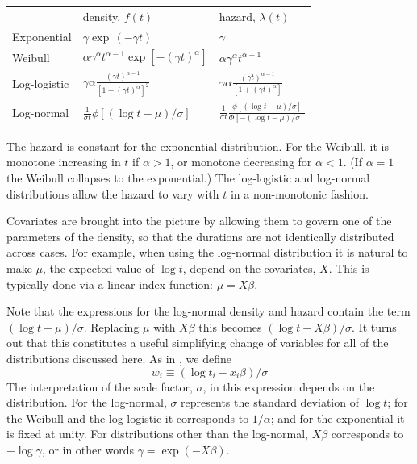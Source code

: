 \begin{center}
\setlength\tabcolsep{1.5em}
\begin{tabular}{lll}
 & density, $f(t)$ & hazard, $\lambda(t)$ \\ [1ex]
Exponential & $\displaystyle 
\gamma \exp\,(-\gamma t)$ &$\displaystyle
\gamma$ \\ [1ex]
Weibull & $\displaystyle
\alpha\gamma^{\alpha}t^{\alpha-1}\exp\left[-(\gamma t)^\alpha\right]$ 
& $\displaystyle \alpha\gamma^{\alpha}t^{\alpha-1}$ \\ [1ex]
Log-logistic & $\displaystyle \gamma\alpha
\frac{(\gamma t)^{\alpha-1}}
{\left[1 + (\gamma t)^\alpha\right]^2}$ 
& $\displaystyle \gamma\alpha
\frac{(\gamma t)^{\alpha-1}}
{\left[1 + (\gamma t)^\alpha\right]}$ \\ [2.5ex]
Log-normal & $\displaystyle
\frac{1}{\sigma t} \phi\left[(\log t - \mu)/\sigma \right]$ 
& $\displaystyle
\frac{1}{\sigma t} \frac{\phi\left[(\log t - \mu)/\sigma \right]}
{\Phi\left[-(\log t - \mu)/\sigma \right]}$
\end{tabular}
\end{center}

The hazard is constant for the exponential distribution.  For the
Weibull, it is monotone increasing in $t$ if $\alpha > 1$, or
monotone decreasing for $\alpha < 1$. (If $\alpha = 1$ the Weibull
collapses to the exponential.)  The log-logistic and log-normal
distributions allow the hazard to vary with $t$ in a non-monotonic
fashion.

Covariates are brought into the picture by allowing them to govern one
of the parameters of the density, so that the durations are not
identically distributed across cases.  For example, when using the
log-normal distribution it is natural to make $\mu$, the expected
value of $\log t$, depend on the covariates, $X$.  This is typically
done via a linear index function: $\mu = X\beta$.

Note that the expressions for the log-normal density and hazard
contain the term $(\log t - \mu)/\sigma$.  Replacing $\mu$ with
$X\beta$ this becomes $(\log t - X\beta)/\sigma$.  It turns out that
this constitutes a useful simplifying change of variables for all of
the distributions discussed here. As in \cite{kalbfleisch02}, we
define
\[
w_i \equiv (\log t_i - x_i\beta)/\sigma
\]
The interpretation of the scale factor, $\sigma$, in this expression
depends on the distribution. For the log-normal, $\sigma$ represents
the standard deviation of $\log t$; for the Weibull and the
log-logistic it corresponds to $1/\alpha$; and for the exponential it
is fixed at unity. For distributions other than the log-normal,
$X\beta$ corresponds to $-\log \gamma$, or in other words $\gamma =
\exp(-X\beta)$.

